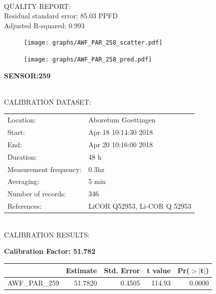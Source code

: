 \documentclass[oneside]{report}
\begin{document}
\hrulefill\\
QUALITY REPORT:\\
Residual standard error: 85.03 PPFD\\
Adjusted R-squared: 0.993



\begin{figure}[H]
  \centering
  \texttt{[image: graphs/AWF\_PAR\_258\_scatter.pdf]}
\end{figure}




\begin{figure}[H]
  \centering
  \texttt{[image: graphs/AWF\_PAR\_258\_pred.pdf]}
\end{figure}

\pagebreak


\begin{center}
\large{\textbf{SENSOR:259}}\\
\end{center}

\hrulefill\\
CALIBRATION DATASET:\\
\begin{table}[h!]
  \centering
  \label{tab:table1}
  \begin{tabular}{ll}
    Location: & Aboretum Goettingen\\ 
    
    
    Start:  & Apr 18 10:14:30 2018 \\
    End:   & Apr 20 10:16:00 2018\\ 
    Duration: & 48 h\\
    Measurement frequency: & 0.3hz\\
    Averaging:  &5 min\\
    Number of records: & 346 \\
    References: & LiCOR Q52953, Li-COR Q 52953 \\
  \end{tabular}
\end{table}

\hrulefill\\
CALIBRATION RESULTS:\\


\begin{center}
\textbf{\large{Calibration Factor: 51.782}}\\
\end{center}
\begin{table}[ht]
\centering
\begin{tabular}{rrrrr}
  \hline
 & Estimate & Std. Error & t value & Pr($>$$|$t$|$) \\ 
  \hline
AWF\_PAR\_259 & 51.7820 & 0.4505 & 114.93 & 0.0000 \\ 
   \hline
\end{tabular}
\end{table}
\end{document}
